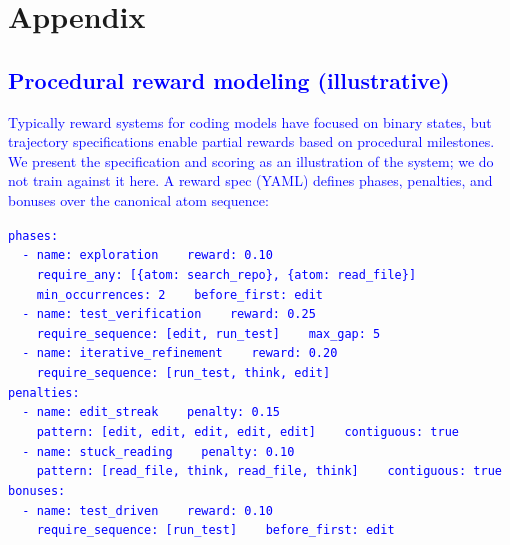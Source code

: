 \documentclass[11pt]{article}
\begin{document}
\section{Appendix}

\subsection{\textcolor{blue}{Procedural reward modeling (illustrative)}}
\label{app:reward}

\textcolor{blue}{Typically reward systems for coding models have focused on binary states, but trajectory specifications enable partial rewards based on procedural milestones. We present the specification and scoring as an illustration of the system; we do not train against it here. A reward spec (YAML) defines phases, penalties, and bonuses over the canonical atom sequence:}

\begin{tcolorbox}[colback=black!3, colframe=black!30, boxrule=0.4pt,
  left=10pt, right=10pt, top=8pt, bottom=8pt, fontupper=\small]
\textcolor{blue}{
\texttt{phases:}\\
\texttt{~~- name: exploration~~~~reward: 0.10}\\
\texttt{~~~~require\_any: [\{atom: search\_repo\}, \{atom: read\_file\}]}\\
\texttt{~~~~min\_occurrences: 2~~~~before\_first: edit}\\
\texttt{~~- name: test\_verification~~~~reward: 0.25}\\
\texttt{~~~~require\_sequence: [edit, run\_test]~~~~max\_gap: 5}\\
\texttt{~~- name: iterative\_refinement~~~~reward: 0.20}\\
\texttt{~~~~require\_sequence: [run\_test, think, edit]}\\
\texttt{penalties:}\\
\texttt{~~- name: edit\_streak~~~~penalty: 0.15}\\
\texttt{~~~~pattern: [edit, edit, edit, edit, edit]~~~~contiguous: true}\\
\texttt{~~- name: stuck\_reading~~~~penalty: 0.10}\\
\texttt{~~~~pattern: [read\_file, think, read\_file, think]~~~~contiguous: true}\\
\texttt{bonuses:}\\
\texttt{~~- name: test\_driven~~~~reward: 0.10}\\
\texttt{~~~~require\_sequence: [run\_test]~~~~before\_first: edit}
}
\end{tcolorbox}
\end{document}
